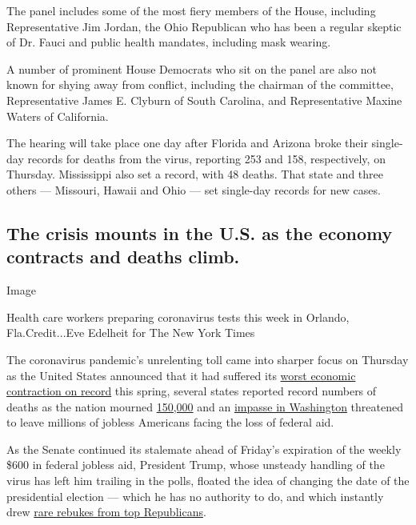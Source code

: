 The panel includes some of the most fiery members of the House,
including Representative Jim Jordan, the Ohio Republican who has been a
regular skeptic of Dr. Fauci and public health mandates, including mask
wearing.

A number of prominent House Democrats who sit on the panel are also not
known for shying away from conflict, including the chairman of the
committee, Representative James E. Clyburn of South Carolina, and
Representative Maxine Waters of California.

The hearing will take place one day after Florida and Arizona broke
their single-day records for deaths from the virus, reporting 253 and
158, respectively, on Thursday. Mississippi also set a record, with 48
deaths. That state and three others --- Missouri, Hawaii and Ohio ---
set single-day records for new cases.

\hypertarget{the-crisis-mounts-in-the-us-as-the-economy-contracts-and-deaths-climb}{%
\subsection{The crisis mounts in the U.S. as the economy contracts and
deaths
climb.}\label{the-crisis-mounts-in-the-us-as-the-economy-contracts-and-deaths-climb}}

Image

Health care workers preparing coronavirus tests this week in Orlando,
Fla.Credit...Eve Edelheit for The New York Times

The coronavirus pandemic's unrelenting toll came into sharper focus on
Thursday as the United States announced that it had suffered its
\href{https://www.nytimes3xbfgragh.onion/live/2020/07/30/business/stock-market-today-coronavirus?action=click\&module=Top\%20Stories\&pgtype=Homepage}{worst
economic contraction on record} this spring, several states reported
record numbers of deaths as the nation mourned
\href{https://www.nytimes3xbfgragh.onion/2020/07/29/us/coronavirus-deaths-150000.html}{150,000}
and an
\href{https://www.nytimes3xbfgragh.onion/interactive/2020/07/30/upshot/coronavirus-stimulus-bill.html}{impasse
in Washington} threatened to leave millions of jobless Americans facing
the loss of federal aid.

As the Senate continued its stalemate ahead of Friday's expiration of
the weekly \$600 in federal jobless aid, President Trump, whose unsteady
handling of the virus has left him trailing in the polls, floated the
idea of changing the date of the presidential election --- which he has
no authority to do, and which instantly drew
\href{https://www.nytimes3xbfgragh.onion/2020/07/30/us/elections/biden-vs-trump.html?action=click\&module=Top\%20Stories\&pgtype=Homepage}{rare
rebukes from top Republicans}.

